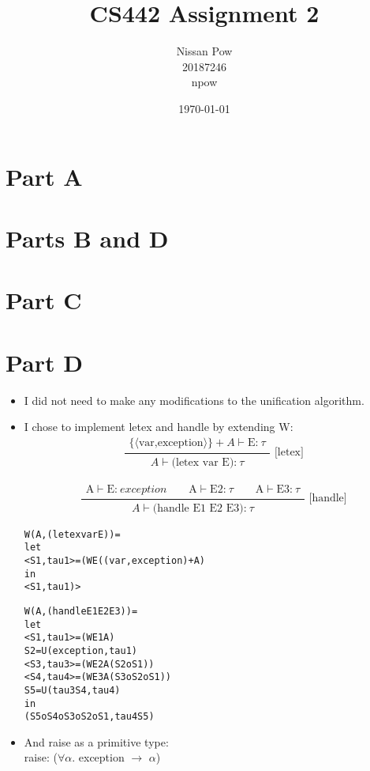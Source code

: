\documentclass[onecolumn,11pt]{article}
\title{CS442 Assignment 2}
\author{Nissan Pow\\20187246\\npow}
\date{\today}
\newcommand{\post}[2]{\ensuremath{\frac{\begin{array}{c}#1\end{array}}{\begin{array}{c}#2\end{array}}}}
\begin{document}
\maketitle

\section*{Part A}

\section*{Parts B and D}
\begin{alltt}
\end{alltt}

\section*{Part C}

\begin{alltt}
\end{alltt}

\section*{Part D}
\begin{itemize}
\item I did not need to make any modifications to the unification algorithm.
\item I chose to implement letex and handle by extending W:
 \[\post
    { \{ \langle \text{var,exception} \rangle \} + A \vdash \text{E:}\ \tau} 
    { A \vdash \text{(letex\ var E):}\ \tau }
    \text{\ [letex]}
\]

\[\post
    { \text{A} \vdash \text{E:}\ exception \qquad \text{A} \vdash \text{E2:}\ \tau \qquad \text{A} \vdash \text{E3:}\ \tau }
    { A \vdash \text{(handle E1 E2 E3):}\ \tau }
    \text{\ [handle]}
\]

\begin{alltt}
W (A, (letex var E)) = 
  let 
    <S1, tau1> = (W E ((var,exception) + A) 
  in 
    <S1, tau1)>

W (A, (handle E1 E2 E3)) =
  let
    <S1, tau1> = (W E1 A)
    S2 = U(exception, tau1)
    <S3, tau3> = (W E2 A(S2 o S1))
    <S4, tau4> = (W E3 A(S3 o S2 o S1))
    S5 = U(tau3 S4, tau4)
  in
    (S5 o S4 o S3 o S2 o S1, tau4 S5)

\end{alltt}

\item And raise as a primitive type: \\
raise: ($\forall \alpha$. exception $\to$ $\alpha$)

\end{itemize}
\end{document}
